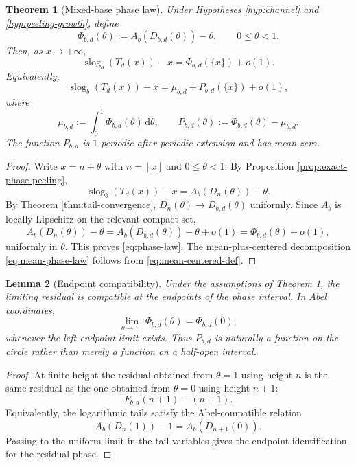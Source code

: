 \documentclass[11pt,a4paper]{article}
\theoremstyle{plain}
\newtheorem{theorem}{Theorem}[section]
\newtheorem{lemma}[theorem]{Lemma}
\theoremstyle{definition}
\theoremstyle{remark}
\newcommand{\dd}{\,\mathrm{d}}
\newcommand{\slog}{\operatorname{slog}}
\newcommand{\floor}[1]{\left\lfloor #1\right\rfloor}
\begin{document}
\begin{theorem}[Mixed-base phase law]\label{thm:phase-law}
Under Hypotheses \ref{hyp:channel} and \ref{hyp:peeling-growth}, define
\begin{equation}\label{eq:Phi-def}
  \Phi_{b,d}(\theta):=A_b(D_{b,d}(\theta))-\theta,
  \qquad 0\leq\theta<1.
\end{equation}
Then, as $x\to+\infty$,
\begin{equation}\label{eq:phase-law}
  \slog_b(T_d(x))-x=\Phi_{b,d}(\{x\})+o(1).
\end{equation}
Equivalently,
\begin{equation}\label{eq:mean-phase-law}
  \slog_b(T_d(x))-x=\mu_{b,d}+P_{b,d}(\{x\})+o(1),
\end{equation}
where
\begin{equation}\label{eq:mean-centered-def}
  \mu_{b,d}:=\int_0^1\Phi_{b,d}(\theta)\dd\theta,
  \qquad
  P_{b,d}(\theta):=\Phi_{b,d}(\theta)-\mu_{b,d}.
\end{equation}
The function $P_{b,d}$ is $1$-periodic after periodic extension and has mean zero.
\end{theorem}

\begin{proof}
Write $x=n+\theta$ with $n=\floor{x}$ and $0\leq\theta<1$.  By Proposition \ref{prop:exact-phase-peeling},
\[
  \slog_b(T_d(x))-x=A_b(D_n(\theta))-\theta.
\]
By Theorem \ref{thm:tail-convergence}, $D_n(\theta)\to D_{b,d}(\theta)$ uniformly.  Since $A_b$ is locally Lipschitz on the relevant compact set,
\[
  A_b(D_n(\theta))-\theta=A_b(D_{b,d}(\theta))-\theta+o(1)=\Phi_{b,d}(\theta)+o(1),
\]
uniformly in $\theta$.  This proves \eqref{eq:phase-law}.  The mean-plus-centered decomposition \eqref{eq:mean-phase-law} follows from \eqref{eq:mean-centered-def}.
\end{proof}

\begin{lemma}[Endpoint compatibility]\label{lem:endpoint-compatibility}
Under the assumptions of Theorem \ref{thm:phase-law}, the limiting residual is compatible at the endpoints of the phase interval.  In Abel coordinates,
\[
  \lim_{\theta\to1^-}\Phi_{b,d}(\theta)=\Phi_{b,d}(0),
\]
whenever the left endpoint limit exists.  Thus $P_{b,d}$ is naturally a function on the circle rather than merely a function on a half-open interval.
\end{lemma}

\begin{proof}
At finite height the residual obtained from $\theta=1$ using height $n$ is the same residual as the one obtained from $\theta=0$ using height $n+1$:
\[
  F_{b,d}(n+1)-(n+1).
\]
Equivalently, the logarithmic tails satisfy the Abel-compatible relation
\[
  A_b(D_n(1))-1=A_b(D_{n+1}(0)).
\]
Passing to the uniform limit in the tail variables gives the endpoint identification for the residual phase.
\end{proof}
\end{document}
